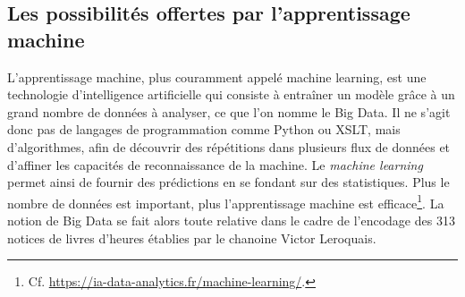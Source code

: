\documentclass[a4paper,12pt,twoside]{book}
\begin{document}
	\subsection{Les possibilités offertes par l’apprentissage machine}
	
	L'apprentissage machine, plus couramment appelé \og machine learning\fg{}, est une technologie d'intelligence artificielle qui consiste à entraîner un modèle grâce à un grand nombre de données à analyser, ce que l'on nomme le Big Data. Il ne s'agit donc pas de langages de programmation comme Python ou XSLT, mais d'algorithmes, afin de découvrir des répétitions dans plusieurs flux de données et d'affiner les capacités de reconnaissance de la machine. Le \textit{machine learning} permet ainsi de fournir des prédictions en se fondant sur des statistiques. Plus le nombre de données est important, plus l'apprentissage machine est efficace\footnote{Cf. \url{https://ia-data-analytics.fr/machine-learning/}.}. La notion de Big Data se fait alors toute relative dans le cadre de l'encodage des 313 notices de livres d'heures établies par le chanoine Victor Leroquais. \\
	
\end{document}
